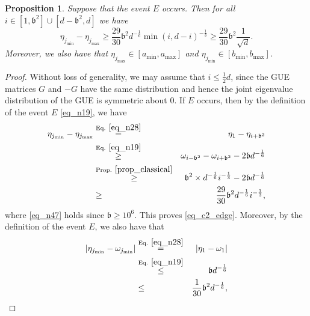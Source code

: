 \documentclass[11pt,letterpaper]{article}
\newtheorem{proposition}[theorem]{Proposition}
\begin{document}
%
\begin{proposition}\label{prop_n1_edge}
Suppose that the event $E$ occurs.
%
Then for all $i \in [1, \mathfrak{b}^2] \cup [d- \mathfrak{b}^2, d]$ we have
%
\begin{equation}\label{eq_c2_edge}
    \eta_{j_{\mathrm{min}}} - \eta_{j_{\mathrm{max}}} \geq    \frac{29}{30} \mathfrak{b}^2 d^{-\frac{1}{6}} \min(i, d-i)^{-\frac{1}{3}} \geq  \frac{29}{30} \mathfrak{b}^2 \frac{1}{\sqrt{d}}.
\end{equation}
%
Moreover, we also have that 
%
$ \eta_{j_{\mathrm{max}}}  \in[a_{\mathrm{min}}, a_{\mathrm{max}}]$ and  $ \eta_{j_{\mathrm{min}}}  \in[b_{\mathrm{min}}, b_{\mathrm{max}}]$.

\end{proposition}
%
\begin{proof}
Without loss of generality, we may assume that 
%
$i \leq \frac{1}{2}d$,  since the GUE matrices $G$ and $-G$ have the same distribution and hence the joint eigenvalue distribution of the GUE is symmetric about $0$.
%
If $E$ occurs, then by the definition of the event $E$ \eqref{eq_n19}, we have
%
%
%
\begin{eqnarray}
   \eta_{j_{\mathrm{min}}} - \eta_{j_{\mathrm{max}}} 
  & \stackrel{\textrm{Eq. } \eqref{eq_n28}}{=}&  \eta_{1} - \eta_{i+ \mathfrak{b}^2} \nonumber\\
   &\stackrel{\textrm{Eq. } \eqref{eq_n19}}{\geq} &    \omega_{i- \mathfrak{b}^2} - \omega_{i+ \mathfrak{b}^2} - 2\mathfrak{b} d^{-\frac{1}{6}} \nonumber\\
    & \stackrel{\textrm{Prop. } \ref{prop_classical}}{\geq}& \mathfrak{b}^2 \times  d^{-\frac{1}{6}} i^{-\frac{1}{3}} - 2\mathfrak{b} d^{-\frac{1}{6}} \nonumber\\
%    
         &\geq & \frac{29}{30} \mathfrak{b}^2 d^{-\frac{1}{6}} i^{-\frac{1}{3}}, \label{eq_n47}
%
\end{eqnarray}
%
where \eqref{eq_n47} holds since $\mathfrak{b} \geq 10^6$.
%
This proves \eqref{eq_c2_edge}.
%
Moreover, by the definition of the event $E$, we also have that 
\begin{eqnarray}
  |\eta_{j_{\mathrm{min}}} -  \omega_{j_{\mathrm{min}}}| 
   &\stackrel{\textrm{Eq. } \eqref{eq_n28}}{=} & |\eta_{1} -  \omega_{1}| \nonumber\\
    &\stackrel{\textrm{Eq. } \eqref{eq_n19}}{\leq} &  \mathfrak{b} d^{-\frac{1}{6}}\nonumber\\
%
    &\leq & \frac{1}{30} \mathfrak{b}^2 d^{-\frac{1}{6}}, \label{eq_c1_edge}

\end{eqnarray}
\end{proof}
\end{document}
